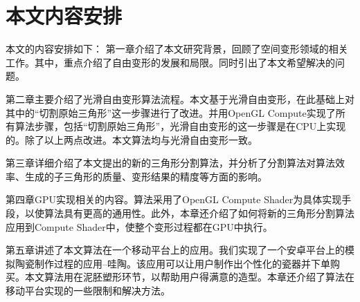 



\section{本文内容安排}
本文的内容安排如下：
第一章介绍了本文研究背景，回顾了空间变形领域的相关工作。其中，重点介绍了自由变形的发展和局限。同时引出了本文希望解决的问题。

第二章主要介绍了光滑自由变形\cite{Cui15}算法流程。本文基于光滑自由变形，在此基础上对其中的“切割原始三角形”这一步骤进行了改进。并用OpenGL Compute实现了所有算法步骤，包括“切割原始三角形”，光滑自由变形的这一步骤是在CPU上实现的。除了以上两点改进。本文算法均与光滑自由变形一致。

第三章详细介绍了本文提出的新的三角形分割算法，并分析了分割算法对算法效率、生成的子三角形的质量、变形结果的精度等方面的影响。

第四章GPU实现相关的内容。算法采用了OpenGL Compute Shader为具体实现手段，以使算法具有更高的通用性。此外，本章还介绍了如何将新的三角形分割算法应用到Compute Shader中，使整个变形过程都在GPU中执行。

第五章讲述了本文算法在一个移动平台上的应用。我们实现了一个安卓平台上的模拟陶瓷制作过程的应用--哇陶。该应用可以让用户制作出个性化的瓷器并下单购买。本文算法用在泥胚塑形环节，以帮助用户得满意的造型。本章还介绍了算法在移动平台实现的一些限制和解决方法。




